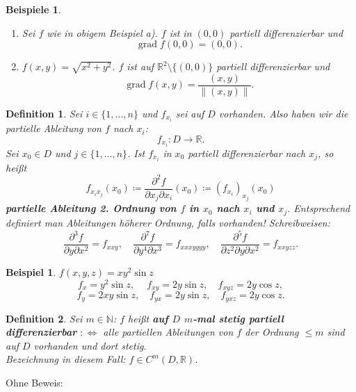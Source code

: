 \documentclass[12pt]{extreport} %
\newcommand{\N}{\mathbb{N}}
\newcommand{\R}{\mathbb{R}}
\theoremstyle{named}
\theoremstyle{nnamed}
\theoremstyle{itshape}
\newtheorem*{definition}{Definition}
\theoremstyle{normal}
\newtheorem*{beispiel*}{Beispiel}
\newtheorem*{beispiele}{Beispiele}
\begin{document}
\begin{beispiele} ~\
	\begin{enumerate}
		\item Sei $f$ wie in obigem Beispiel a). $f$ ist in $(0,0)$ partiell differenzierbar und 
		$$ \operatorname{grad} f(0,0) = (0, 0). $$
		\item $f(x, y) = \sqrt{x^{2} + y^{2}}$. $f$ ist auf $\R^{2} \setminus \{ (0,0) \}$ partiell differenzierbar und
			$$ \operatorname{grad} f(x, y) = \frac{(x, y)}{\|(x, y) \|}.$$
	\end{enumerate}
\end{beispiele}

 
\begin{definition}
	Sei $i \in \{1, \dotsc, n \}$ und $f_{x_{i}}$ sei auf $D$ vorhanden. Also haben wir die partielle Ableitung von $f$ nach $x_{i}$:
	$$ f_{x_{i}} \colon D \rightarrow \R. $$
	Sei $x_{0} \in D$ und $j \in \{1, \dotsc, n \}$. Ist $f_{x_{i}}$ in $x_{0}$ partiell differenzierbar nach $x_{j}$, so hei{\ss}t
	$$ f_{x_{i} x_{j}} (x_{0}) \coloneqq \frac{\partial^{2} f}{\partial x_{j} \partial x_{i}} (x_{0}) \coloneqq \left( f_{x_{i}} \right)_{x_{j}} (x_{0}) $$
	\textbf{partielle Ableitung 2. Ordnung von $f$ in $x_{0}$ nach $x_{i}$ und $x_{j}$}. Entsprechend definiert man Ableitungen höherer Ordnung, falls vorhanden! Schreibweisen:
	$$ \frac{\partial^{3} f}{\partial y \partial x^{2}} = f_{xxy}, \quad \frac{\partial^{7} f}{\partial y^{4} \partial x^{3}} = f_{xxxyyyy}, \quad \frac{\partial^{5} f}{\partial z^{2} \partial y \partial x^{2}} = f_{xxyzz}. $$
\end{definition}


\begin{beispiel*}
	$f(x,y,z) =  x y^{2} \sin z$
	$$ f_{x} = y^{2} \sin z, ~\quad f_{xy} = 2y \sin z, \quad f_{xyz} = 2y \cos z, $$
	$$ f_{y} = 2xy \sin z, \quad f_{yx} = 2y \sin z, \quad f_{yxz} = 2 y \cos z. $$
\end{beispiel*}

\begin{definition}
	Sei $m \in \N$: $f$ hei{\ss}t \textbf{auf $D$ $m$-mal stetig partiell differenzierbar} $:\iff$ alle partiellen Ableitungen von $f$ der Ordnung $\leq m$ sind auf $D$ vorhanden und dort stetig. ~\\
	Bezeichnung in diesem Fall: $f \in C^{m}(D, \R)$.
\end{definition}

Ohne Beweis:
\end{document}
